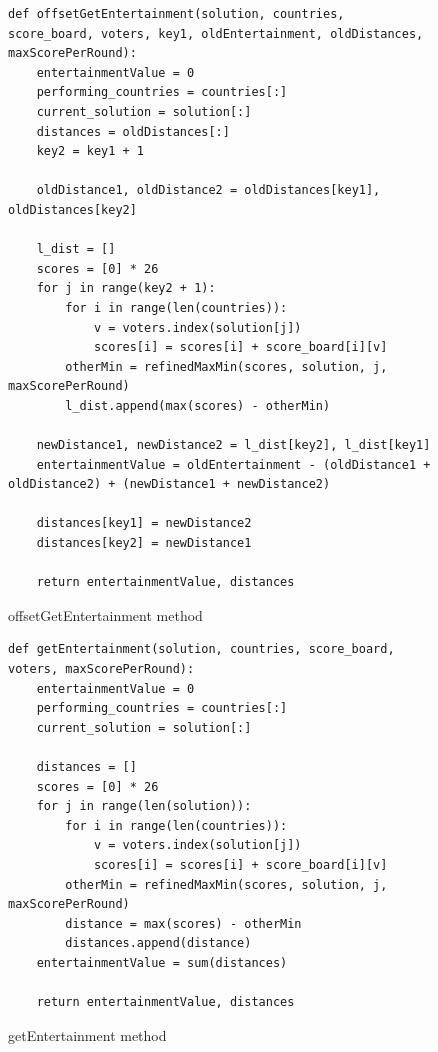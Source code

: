 \documentclass[12pt]{report}
\begin{document}
\begin{figure}[H]
\caption{offsetGetEntertainment method}
\label{offsetGetEntertainment}
\begin{lstlisting}
def offsetGetEntertainment(solution, countries, score_board, voters, key1, oldEntertainment, oldDistances, maxScorePerRound):
    entertainmentValue = 0
    performing_countries = countries[:]
    current_solution = solution[:]
    distances = oldDistances[:]
    key2 = key1 + 1

    oldDistance1, oldDistance2 = oldDistances[key1], oldDistances[key2]

    l_dist = []
    scores = [0] * 26
    for j in range(key2 + 1):
        for i in range(len(countries)):
            v = voters.index(solution[j])
            scores[i] = scores[i] + score_board[i][v]
        otherMin = refinedMaxMin(scores, solution, j, maxScorePerRound)
        l_dist.append(max(scores) - otherMin)
    
    newDistance1, newDistance2 = l_dist[key2], l_dist[key1]
    entertainmentValue = oldEntertainment - (oldDistance1 + oldDistance2) + (newDistance1 + newDistance2)
    
    distances[key1] = newDistance2
    distances[key2] = newDistance1
    
    return entertainmentValue, distances
\end{lstlisting}
\end{figure}

\begin{figure}[H]
\caption{getEntertainment method}
\label{getEntertainment}
\begin{lstlisting}
def getEntertainment(solution, countries, score_board, voters, maxScorePerRound):
    entertainmentValue = 0
    performing_countries = countries[:]
    current_solution = solution[:]
    
    distances = []
    scores = [0] * 26
    for j in range(len(solution)):
        for i in range(len(countries)):
            v = voters.index(solution[j])
            scores[i] = scores[i] + score_board[i][v]
        otherMin = refinedMaxMin(scores, solution, j, maxScorePerRound)
        distance = max(scores) - otherMin
        distances.append(distance)
    entertainmentValue = sum(distances)
    
    return entertainmentValue, distances
\end{lstlisting}
\end{figure}
\end{document}
